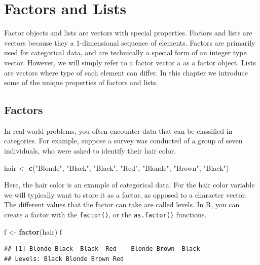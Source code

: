 \documentclass[
]{book}
\newenvironment{Shaded}{\begin{snugshade}}{\end{snugshade}}
\newcommand{\KeywordTok}[1]{\textcolor[rgb]{0.13,0.29,0.53}{\textbf{#1}}}
\newcommand{\NormalTok}[1]{#1}
\newcommand{\StringTok}[1]{\textcolor[rgb]{0.31,0.60,0.02}{#1}}
\begin{document}
\hypertarget{factors-and-lists}{%
\chapter{Factors and Lists}\label{factors-and-lists}}

Factor objects and lists are vectors with special properties. Factors and lists are vectors because they a 1-dimensional sequence of elements. Factors are primarily used for categorical data, and are technically a special form of an integer type vector. However, we will simply refer to a factor vector a as a factor object. Lists are vectors where type of each element can differ. In this chapter we introduce some of the unique properties of factors and lists.

\hypertarget{factors}{%
\section{Factors}\label{factors}}

In real-world problems, you often encounter data that can be classified in categories. For example, suppose a survey was conducted of a group of seven individuals, who were asked to identify their hair color.

\begin{Shaded}
\begin{Highlighting}[]
\NormalTok{hair <-}\StringTok{ }\KeywordTok{c}\NormalTok{(}\StringTok{"Blonde"}\NormalTok{, }\StringTok{"Black"}\NormalTok{, }\StringTok{"Black"}\NormalTok{, }\StringTok{"Red"}\NormalTok{, }\StringTok{"Blonde"}\NormalTok{, }\StringTok{"Brown"}\NormalTok{,}
    \StringTok{"Black"}\NormalTok{)}
\end{Highlighting}
\end{Shaded}

Here, the hair color is an example of categorical data. For the hair color variable we will typically want to store it as a factor, as opposed to a character vector. The different values that the factor can take are called levels. In R, you can create a factor with the \texttt{factor()}, or the \texttt{as.factor()} functions.

\begin{Shaded}
\begin{Highlighting}[]
\NormalTok{f <-}\StringTok{ }\KeywordTok{factor}\NormalTok{(hair)}
\NormalTok{f}
\end{Highlighting}
\end{Shaded}

\begin{verbatim}
## [1] Blonde Black  Black  Red    Blonde Brown  Black 
## Levels: Black Blonde Brown Red
\end{verbatim}
\end{document}
